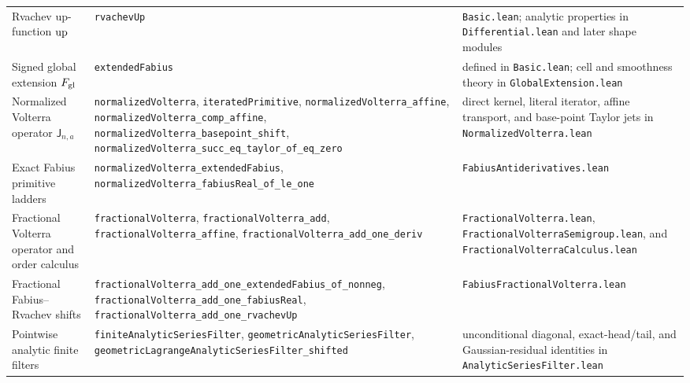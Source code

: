 \documentclass[11pt,oneside]{article}
\theoremstyle{definition}
\theoremstyle{remark}
\begin{document}
\begin{longtable}{@{}>{\raggedright\arraybackslash}p{} >{\raggedright\arraybackslash}p{} >{\raggedright\arraybackslash}p{}@{}}
Rvachev up-function \(\operatorname{up}\) & \nolinkurl{rvachevUp} & \nolinkurl{Basic.lean}; analytic properties in \nolinkurl{Differential.lean} and later shape modules \\
Signed global extension \(F_{\mathrm{gl}}\) & \nolinkurl{extendedFabius} & defined in \nolinkurl{Basic.lean}; cell and smoothness theory in \nolinkurl{GlobalExtension.lean} \\
Normalized Volterra operator \(\mathsf J_{n,a}\) & \nolinkurl{normalizedVolterra}, \nolinkurl{iteratedPrimitive}, \nolinkurl{normalizedVolterra_affine}, \nolinkurl{normalizedVolterra_comp_affine}, \nolinkurl{normalizedVolterra_basepoint_shift}, \nolinkurl{normalizedVolterra_succ_eq_taylor_of_eq_zero} & direct kernel, literal iterator, affine transport, and base-point Taylor jets in \nolinkurl{NormalizedVolterra.lean} \\
Exact Fabius primitive ladders & \nolinkurl{normalizedVolterra_extendedFabius}, \nolinkurl{normalizedVolterra_fabiusReal_of_le_one} & \nolinkurl{FabiusAntiderivatives.lean} \\
Fractional Volterra operator and order calculus & \nolinkurl{fractionalVolterra}, \nolinkurl{fractionalVolterra_add}, \nolinkurl{fractionalVolterra_affine}, \nolinkurl{fractionalVolterra_add_one_deriv} & \nolinkurl{FractionalVolterra.lean}, \nolinkurl{FractionalVolterraSemigroup.lean}, and \nolinkurl{FractionalVolterraCalculus.lean} \\
Fractional Fabius--Rvachev shifts & \nolinkurl{fractionalVolterra_add_one_extendedFabius_of_nonneg}, \nolinkurl{fractionalVolterra_add_one_fabiusReal}, \nolinkurl{fractionalVolterra_add_one_rvachevUp} & \nolinkurl{FabiusFractionalVolterra.lean} \\
Pointwise analytic finite filters & \nolinkurl{finiteAnalyticSeriesFilter}, \nolinkurl{geometricAnalyticSeriesFilter}, \nolinkurl{geometricLagrangeAnalyticSeriesFilter_shifted} & unconditional diagonal, exact-head/tail, and Gaussian-residual identities in \nolinkurl{AnalyticSeriesFilter.lean} \\

\end{longtable}
\end{document}
